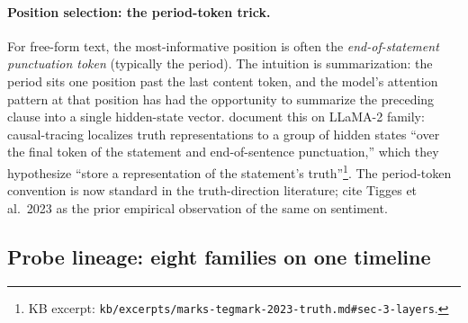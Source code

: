 \paragraph{Position selection: the period-token trick.} For free-form
text, the most-informative  position is often the
\emph{end-of-statement punctuation token} (typically the period). The
intuition is summarization: the period sits one position past the last
content token, and the model's attention pattern at that position has had
the opportunity to summarize the preceding clause into a single
hidden-state vector. \citet[\S 3]{marks-tegmark-2023-truth} document this
on LLaMA-2 family: causal-tracing localizes truth representations to a
group of hidden states ``over the final token of the statement and
end-of-sentence punctuation,'' which they hypothesize ``store a
representation of the statement's truth''\footnote{KB excerpt:
\texttt{kb/excerpts/marks-tegmark-2023-truth.md\#sec-3-layers}.}. The
period-token convention is now standard in the truth-direction
literature; \citet{marks-tegmark-2023-truth} cite Tigges et al.\ 2023 as
the prior empirical observation of the same  on
sentiment.

\subsection{Probe lineage: eight families on one timeline}
\label{sec:probe-lineage}


